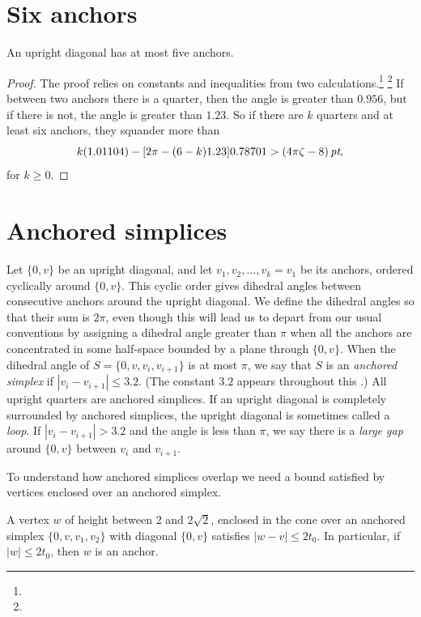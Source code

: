 \section{Six anchors}

\begin{lemma}  An upright diagonal has at most five anchors.
\end{lemma}

\begin{proof}
The proof relies on constants and inequalities from two
calculations.\footnote{} %
\footnote{} %
If between two anchors there is a quarter, then the angle is
greater than $0.956$, but if there is not,  the angle is greater than
$1.23$.  So if there are $k$ quarters and at least six anchors, they
squander more than
    $$ k (1.01104) - [2\pi-(6-k)1.23]0.78701 > (4\pi\zeta-8)\,\hbox{\it pt},$$
for $k\ge0$.
\end{proof}

\section{Anchored simplices}
    \label{sec:anchored-simplex}

Let $\{0,v\}$ be an upright diagonal, and let
$v_1,v_2,\ldots,v_k=v_1$ be its anchors, ordered cyclically around
$\{0,v\}$.  This cyclic order gives dihedral angles between
consecutive anchors around the upright diagonal. We define the
dihedral angles so that their sum is $2\pi$, even though this will
lead us to depart from our usual conventions by assigning a
dihedral angle greater than $\pi$ when all the anchors are
concentrated in some half-space bounded by a plane through
$\{0,v\}$. When the dihedral angle of $S=\{0,v,v_i,v_{i+1}\}$ is at
most $\pi$, we say that $S$ is an {\it anchored simplex\/} if
$|v_i-v_{i+1}|\le3.2$. (The constant $3.2$ appears throughout this
\chap.) All upright quarters are anchored simplices. If an upright
diagonal is completely surrounded by anchored simplices, the
upright diagonal is sometimes called a {\it loop}. If
$|v_i-v_{i+1}|>3.2$ and the angle is less than $\pi$, we say there
is a {\it large gap\/} around $\{0,v\}$ between $v_i$ and $v_{i+1}$.

To understand how anchored simplices overlap we need a bound satisfied
by vertices enclosed over an anchored simplex.

\begin{lemma}
    \label{lemma:anc-simplex-not-enc}
A vertex $w$ of height between 2 and $2\sqrt{2}$, enclosed in the cone
over an anchored simplex $\{0,v,v_1,v_2\}$ with diagonal $\{0,v\}$ satisfies
$|w-v|\le 2t_0$. In particular, if $|w|\le 2t_0$, then $w$ is an anchor.
\end{lemma}

